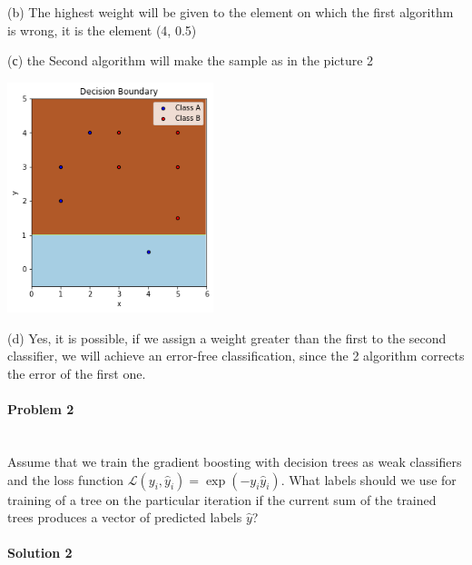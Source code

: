\documentclass{article}
\begin{document}
(b) The highest weight will be given to the element on which the first algorithm is wrong, it is the element (4, 0.5)

(с) the Second algorithm will make the sample as in the picture 2

\includegraphics[width=6cm] {2.png}

(d) Yes, it is possible, if we assign a weight greater than the first to the second classifier, we will achieve an error-free classification, since the 2 algorithm corrects the error of the first one.


\paragraph{Problem 2}\mbox{}\\

Assume that we train the gradient boosting with decision trees as weak classifiers and the loss function $\mathcal{L}(y_i, \hat y_i) = \exp (-y_i\hat y_i)$. What labels should we use for training of a tree on the particular iteration if
the current sum of the trained trees produces a vector of predicted labels $\hat y$?

\paragraph{Solution 2}\mbox{}
\end{document}
